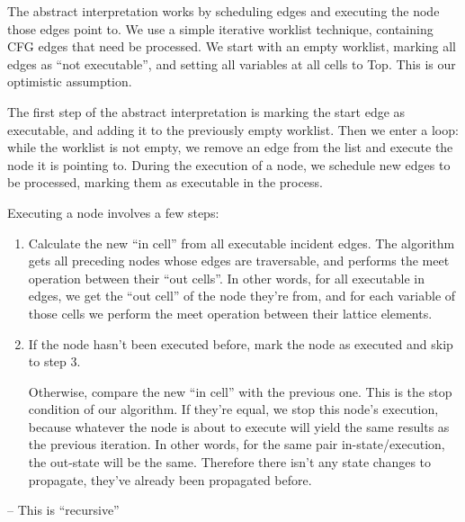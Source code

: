\documentclass[
]{article}
\begin{document}
The abstract interpretation works by scheduling edges and executing the
node those edges point to. We use a simple iterative worklist technique,
containing CFG edges that need be processed. We start with an empty
worklist, marking all edges as ``not executable'', and setting all
variables at all cells to Top. This is our optimistic assumption.

The first step of the abstract interpretation is marking the start edge
as executable, and adding it to the previously empty worklist. Then we
enter a loop: while the worklist is not empty, we remove an edge from
the list and execute the node it is pointing to. During the execution of
a node, we schedule new edges to be processed, marking them as
executable in the process.

Executing a node involves a few steps:

\begin{enumerate}
\def\labelenumi{\arabic{enumi}.}
\item
  Calculate the new ``in cell'' from all executable incident edges. The
  algorithm gets all preceding nodes whose edges are traversable, and
  performs the meet operation between their ``out cells''. In other
  words, for all executable in edges, we get the ``out cell'' of the
  node they're from, and for each variable of those cells we perform the
  meet operation between their lattice elements.
\item
  If the node hasn't been executed before, mark the node as executed and
  skip to step 3.

  Otherwise, compare the new ``in cell'' with the previous one. This is
  the stop condition of our algorithm. If they're equal, we stop this
  node's execution, because whatever the node is about to execute will
  yield the same results as the previous iteration. In other words, for
  the same pair in-state/execution, the out-state will be the same.
  Therefore there isn't any state changes to propagate, they've already
  been propagated before.
\end{enumerate}

-- This is ``recursive''
\end{document}
